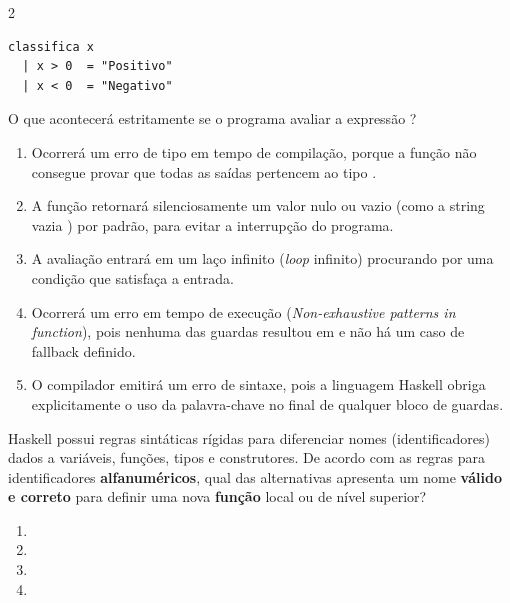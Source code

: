 \documentclass[a4paper,10pt,brazil]{article}
\begin{document}
\begin{multicols}{2}
\begin{verbatim}
classifica x
  | x > 0  = "Positivo"
  | x < 0  = "Negativo"
\end{verbatim}

O que acontecerá estritamente se o programa avaliar a expressão ?

\begin{enumerate}
  \item Ocorrerá um erro de tipo em tempo de compilação, porque a função não consegue provar que todas as saídas pertencem ao tipo .

  \item A função retornará silenciosamente um valor nulo ou vazio (como a string vazia ) por padrão, para evitar a interrupção do programa.

  \item A avaliação entrará em um laço infinito (\emph{loop} infinito) procurando por uma condição que satisfaça a entrada.

  \item Ocorrerá um erro em tempo de execução (\emph{Non-exhaustive patterns in function}), pois nenhuma das guardas resultou em  e não há um caso de fallback definido.

  \item O compilador emitirá um erro de sintaxe, pois a linguagem Haskell obriga explicitamente o uso da palavra-chave  no final de qualquer bloco de guardas.


\end{enumerate}

Haskell possui regras sintáticas rígidas para diferenciar nomes (identificadores) dados a variáveis, funções, tipos e construtores. De acordo com as regras para identificadores \textbf{alfanuméricos}, qual das alternativas apresenta um nome \textbf{válido e correto} para definir uma nova \textbf{função} local ou de nível superior?

\begin{enumerate}
  \item {}

  \item {}
  \item {}

  \item {}


\end{enumerate}
\end{multicols}
\end{document}
